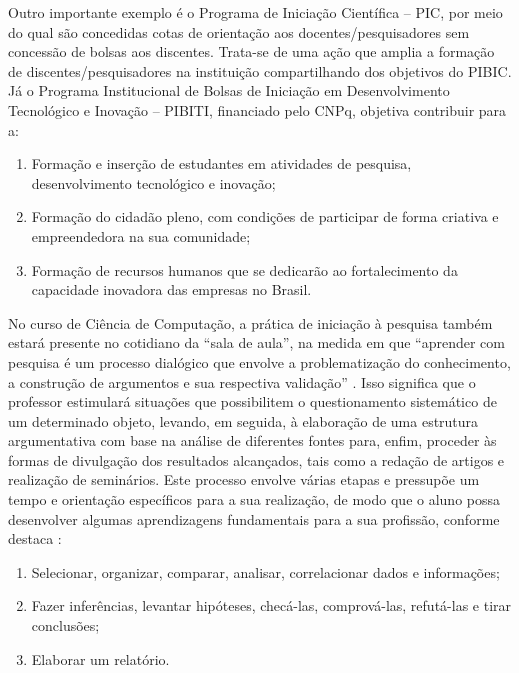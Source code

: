 \documentclass[
	12pt,				%
	openright,			%
  oneside,     %
	a4paper,			%
	chapter=TITLE,		%
	english,			%
	french,				%
	spanish,			%
	brazil				%
	]{abntex2}
\begin{document}
Outro importante exemplo é o Programa de Iniciação Científica – PIC, por meio do qual são concedidas cotas de orientação aos docentes/pesquisadores sem concessão de bolsas aos discentes. Trata-se de uma ação que amplia a formação de discentes/pesquisadores na instituição compartilhando dos objetivos do PIBIC. Já o Programa Institucional de Bolsas de Iniciação em Desenvolvimento Tecnológico e Inovação – PIBITI, financiado pelo CNPq, objetiva contribuir para a:

\begin{enumerate}[label=(\alph*)]
    \item Formação e inserção de estudantes em atividades de pesquisa,  desenvolvimento tecnológico e inovação;
    \item Formação do cidadão pleno, com condições de participar de forma criativa e empreendedora na sua comunidade;
    \item Formação de recursos humanos que se dedicarão ao fortalecimento da capacidade inovadora das 	empresas no Brasil.
\end{enumerate}

No curso de Ciência de Computação, a prática de iniciação à pesquisa também estará presente no cotidiano da “sala de aula”, na medida em que “aprender com pesquisa é um processo dialógico que envolve a problematização do conhecimento, a construção de argumentos e sua respectiva validação” \cite{lampert2008ensino}. Isso significa que o professor estimulará situações que possibilitem o questionamento sistemático de um determinado objeto, levando, em seguida, à elaboração de uma estrutura argumentativa com base na análise de diferentes fontes para, enfim, proceder às formas de divulgação dos resultados alcançados, tais como a redação de artigos e realização de seminários. Este processo envolve várias etapas e pressupõe um tempo e orientação específicos para a sua realização, de modo que o aluno possa desenvolver algumas aprendizagens fundamentais para a sua profissão, conforme destaca :

\begin{enumerate}[label=(\alph*)]
    \item Selecionar, organizar, comparar, analisar, correlacionar dados e informações;
    \item Fazer inferências, levantar hipóteses, checá-las, comprová-las, refutá-las e tirar conclusões;
    \item Elaborar um relatório.
\end{enumerate}
\end{document}
